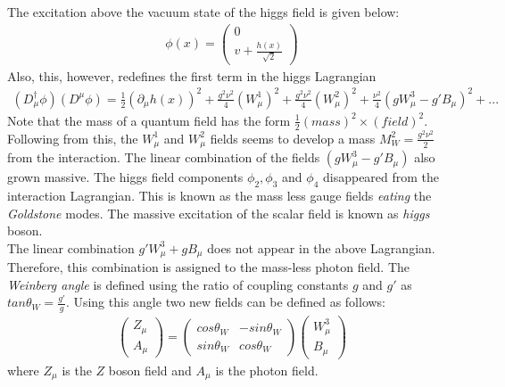 The excitation above the vacuum state of the higgs field is given below:
\begin{eqnarray}
\phi(x)=\left(\begin{array}{l}{0} \\ {v+\frac{h(x)}{\sqrt{2}}}\end{array}\right)
\end{eqnarray}
Also, this, however, redefines the first term in the higgs Lagrangian
\begin{eqnarray}
(D_{\mu}^{\dagger}\phi)(D^{\mu}\phi)=\frac{1}{2}(\partial_{\mu}h(x))^2+\frac{g^2\nu^2}{4}(W_{\mu}^1)^2+\frac{g^2\nu^2}{4}(W^2_{\mu})^2+\frac{\nu^2}{4}(g W_{\mu}^3-g'B_{\mu})^2+...
\end{eqnarray}
Note that the mass of a quantum field has the form $\frac{1}{2}(mass)^2\times(field)^2$. Following from this, the $W_{\mu}^1$ and $W_{\mu}^2$ fields seems to develop a mass $M^2_W=\frac{g^2\nu^2}{2}$ from the interaction. The linear combination of the fields $(g W_{\mu}^3-g'B_{\mu})$ also grown massive. The higgs field components $\phi_2,\phi_3$ and $\phi_4$ disappeared from the interaction Lagrangian. This is known as the mass less gauge fields \textit{eating} the \textit{Goldstone} modes. The massive excitation of the scalar field is known as \textit{higgs} boson.\\
The linear combination $g'W^3_{\mu}+gB_{\mu}$ does not appear in the above Lagrangian. Therefore, this combination is assigned to the mass-less photon field. The \textit{Weinberg angle} is defined using the ratio of coupling constants $g$ and $g'$ as $tan \theta_W=\frac{g'}{g}$. Using this angle two new fields can be defined as follows:
\begin{eqnarray}
\left(\begin{array}{l}{Z_{\mu}} \\ {A_{\mu}}\end{array}\right)=\begin{pmatrix} 
cos\theta_W & -sin\theta_W \\
sin\theta_W & cos\theta_W 
\end{pmatrix}\left(\begin{array}{l}{W_{\mu}^3} \\ {B_{\mu}}\end{array}\right)
\end{eqnarray}  
where $Z_{\mu}$ is the $Z$ boson field and $A_{\mu}$ is the photon field.
